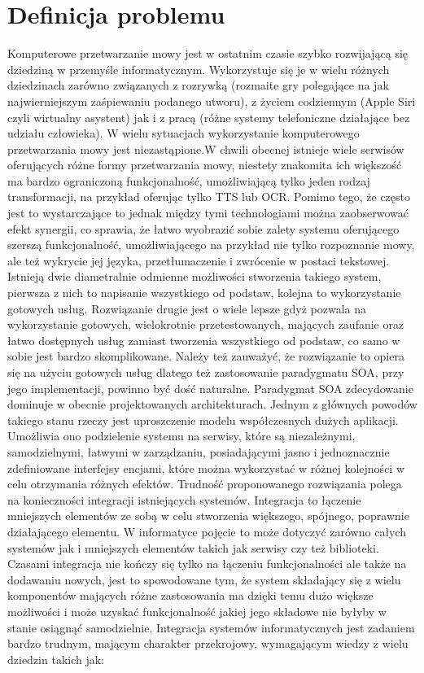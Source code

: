 \section{Definicja problemu} %
Komputerowe przetwarzanie mowy jest w ostatnim czasie szybko rozwijającą się dziedziną w przemyśle informatycznym. Wykorzystuje się je w wielu różnych dziedzinach zarówno związanych z rozrywką (rozmaite gry polegające na jak najwierniejszym zaśpiewaniu podanego utworu), z życiem codziennym (Apple Siri czyli wirtualny asystent) jak i z pracą (różne systemy telefoniczne działające bez udziału człowieka). W wielu sytuacjach wykorzystanie komputerowego przetwarzania mowy jest niezastąpione.W chwili obecnej istnieje wiele serwisów oferujących różne formy przetwarzania mowy, niestety znakomita ich większość ma bardzo ograniczoną funkcjonalność, umożliwiającą tylko jeden rodzaj transformacji, na przykład oferując tylko TTS lub OCR. Pomimo tego, że często jest to wystarczające to jednak między tymi technologiami można zaobserwować efekt synergii, co sprawia, że łatwo wyobrazić sobie zalety systemu oferującego szerszą funkcjonalność, umożliwiającego na przykład nie tylko rozpoznanie mowy, ale też wykrycie jej języka, przetłumaczenie i zwrócenie w postaci tekstowej. Istnieją dwie diametralnie odmienne możliwości stworzenia takiego system, pierwsza z nich to napisanie wszystkiego od podstaw, kolejna to wykorzystanie gotowych usług. Rozwiązanie drugie jest o wiele lepsze gdyż pozwala na wykorzystanie gotowych, wielokrotnie przetestowanych, mających zaufanie oraz łatwo dostępnych usług zamiast tworzenia wszystkiego od podstaw, co samo w sobie jest bardzo skomplikowane. Należy też zauważyć, że rozwiązanie to opiera się na użyciu gotowych usług dlatego też zastosowanie paradygmatu SOA, przy jego implementacji, powinno być dość naturalne. Paradygmat SOA zdecydowanie dominuje w obecnie projektowanych architekturach. Jednym z głównych powodów takiego stanu rzeczy jest uproszczenie modelu współczesnych dużych aplikacji. Umożliwia ono podzielenie systemu na serwisy, które są niezależnymi, samodzielnymi, łatwymi w zarządzaniu, posiadającymi jasno i jednoznacznie zdefiniowane interfejsy encjami, które można wykorzystać w różnej kolejności w celu otrzymania różnych efektów. Trudność proponowanego rozwiązania polega na konieczności integracji istniejących systemów. Integracja to łączenie mniejszych elementów ze sobą w celu stworzenia większego, spójnego, poprawnie działającego elementu. W informatyce pojęcie to może dotyczyć zarówno całych systemów jak i mniejszych elementów takich jak serwisy czy też biblioteki. Czasami integracja nie kończy się tylko na łączeniu funkcjonalności ale także na dodawaniu nowych, jest to spowodowane tym, że system składający się z wielu komponentów mających różne zastosowania ma dzięki temu dużo większe możliwości i może uzyskać funkcjonalność jakiej jego składowe nie byłyby w stanie osiągnąć samodzielnie. Integracja systemów informatycznych jest zadaniem bardzo trudnym, mającym charakter przekrojowy, wymagającym wiedzy z wielu dziedzin takich jak:
